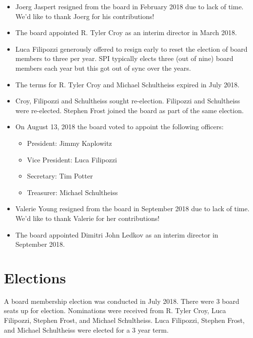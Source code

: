 \documentclass[a4paper]{report}
\begin{document}
\begin{itemize}

\item Joerg Jaspert resigned from the board in February 2018 due to
lack of time.  We'd like to thank Joerg for his contributions!

\item The board appointed R. Tyler Croy as an interim director in March
2018.

\item Luca Filipozzi generously offered to resign early to reset the
election of board members to three per year. SPI typically elects three
(out of nine) board members each year but this got out of sync over the
years.

\item The terms for R. Tyler Croy and Michael Schultheiss expired in
July 2018.

\item Croy, Filipozzi and Schultheiss sought re-election.  Filipozzi and
Schultheiss were re-elected.  Stephen Frost joined the board as part of
the same election.

\item On August 13, 2018 the board voted to appoint the following
officers:

\begin{itemize}
\item President: Jimmy Kaplowitz
\item Vice President: Luca Filipozzi
\item Secretary: Tim Potter
\item Treasurer: Michael Schultheiss
\end{itemize}

\item Valerie Young resigned from the board in September 2018 due to
lack of time.  We'd like to thank Valerie for her contributions!

\item The board appointed Dimitri John Ledkov as an interim director
in September 2018.

\end{itemize}

\section{Elections}

A board membership election was conducted in July 2018.  There were 3
board seats up for election.  Nominations were received from R. Tyler
Croy, Luca Filipozzi, Stephen Frost, and Michael Schultheiss.  Luca
Filipozzi, Stephen Frost, and Michael Schultheiss were elected for a 3
year term.
\end{document}
